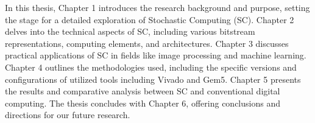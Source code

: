 In this thesis, Chapter 1 introduces the research background and purpose, setting the stage for a detailed exploration of Stochastic Computing (SC). Chapter 2 delves into the technical aspects of SC, including various bitstream representations, computing elements, and architectures. Chapter 3 discusses practical applications of SC in fields like image processing and machine learning. Chapter 4 outlines the methodologies used, including the specific versions and configurations of utilized tools including Vivado and Gem5. Chapter 5 presents the results and comparative analysis between SC and conventional digital computing. The thesis concludes with Chapter 6, offering conclusions and directions for our future research.



